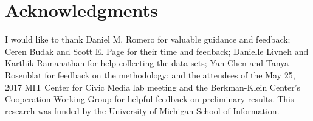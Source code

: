 \section{Acknowledgments}
I would like to thank Daniel M. Romero for valuable guidance and feedback;
Ceren Budak and Scott E. Page for their time and feedback;
Danielle Livneh and Karthik Ramanathan for help collecting the data sets;
Yan Chen and Tanya Rosenblat for feedback on the methodology;
and the attendees of the May 25, 2017 MIT Center for Civic Media lab meeting and
the Berkman-Klein Center's Cooperation Working Group for helpful feedback on
preliminary results.
This research was funded by the University of Michigan School of Information.
